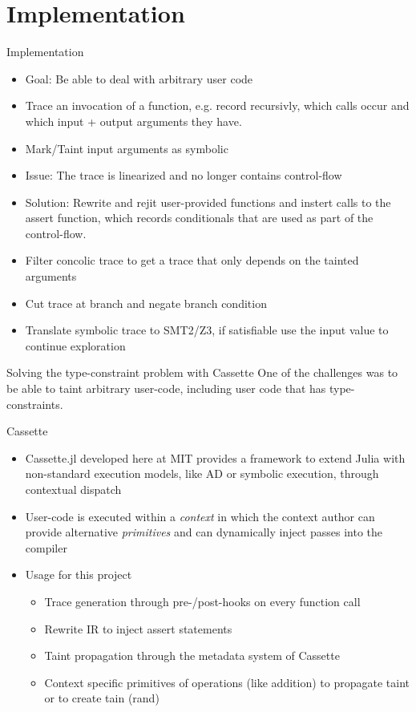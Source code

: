 \documentclass{beamer}
\begin{document}
  \section{Implementation}
  \begin{frame}{Implementation}
      \begin{itemize}[<+->]
        \item Goal: Be able to deal with arbitrary user code
        \item Trace an invocation of a function, e.g. record recursivly,
              which calls occur and which input + output arguments they have.
        \item Mark/Taint input arguments as symbolic
        \item Issue: The trace is linearized and no longer contains control-flow
        \item Solution: Rewrite and rejit user-provided functions and instert calls
              to the assert function, which records conditionals that are used as part
              of the control-flow.
        \item Filter concolic trace to get a trace that only depends on the tainted arguments
        \item Cut trace at branch and negate branch condition
        \item Translate symbolic trace to SMT2/Z3, if satisfiable use the input value to continue exploration
    \end{itemize}
  \end{frame}
  \begin{frame}{Solving the type-constraint problem with Cassette}
      One of the challenges was to be able to taint arbitrary user-code, including user code that has type-constraints. \pause
      \begin{exampleblock}{Cassette}
          \begin{itemize}[<+->]
            \item Cassette.jl \cite{Revels_undated-st} developed here at MIT provides a framework to extend Julia with non-standard execution models, like AD or symbolic execution, through contextual dispatch
            \item User-code is executed within a \emph{context} in which the context author can provide alternative \emph{primitives} and can dynamically inject passes into the compiler
            \item Usage for this project
                \begin{itemize}[<+->]
                \item Trace generation through pre-/post-hooks on every function call
                \item Rewrite IR to inject assert statements
                \item Taint propagation through the metadata system of Cassette
                \item Context specific primitives of operations (like addition) to propagate taint or to create tain (rand)
            \end{itemize}
        \end{itemize}
      \end{exampleblock}
  \end{frame}
\end{document}

